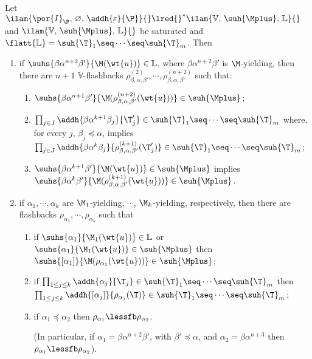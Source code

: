 \begin{lemma}
\label{lem.flashback}
Let $\ilam{\por{I}_{\P},\,\varnothing ,\, \addh{\varepsilon}{\P}
}{} \lred{}^* \ilam{\mathbb{V},\,\suh{\Mplus}, \, \mathbb{L}}{}$ 
and $\ilam{\mathbb{V}, \,\suh{\Mplus} ,\, \mathbb{L}}{}$ 
be saturated and 
$\flatt{\mathbb{L}}=\suh{\T}_1\seq\cdots\seq\suh{\T}_m$. Then
\begin{enumerate}
\item
if $\suhs{\beta\alpha^{n+2}\beta'}{\M(\wt{u})}\in\mathbb{L}$, where 
$\beta\alpha^{n+2}\beta'$ is $\M$-yielding, then there
are $n+1$ $\mathbb{V}$-flashbacks $\rho_{\beta,\alpha,\beta'}^{(2)}, \cdots  
, \rho_{\beta,\alpha,\beta'}^{(n+2)}$ such that:
\begin{enumerate}
\item
$\suhs{\beta \alpha^{n+1}\beta'}{\M(\rho_{\beta,\alpha,\beta'}^{(n+2)}(\wt{u}))} \in 
\suh{\Mplus}$;
\item
$\prod_{j\in J}\addh{\beta \alpha^{k+1}\beta_j}{\T_j'} \in \suh{\T}_1\seq\cdots\seq
\suh{\T}_m$ where, 
for every $j$, $\beta_j \preceq \alpha$, implies 
$\prod_{j\in J}\addh{\beta \alpha^{k}\beta_j}{\rho_{\beta,\alpha,\beta'}^{(k+1)}(\T_j')} 
\in \suh{\T}_1\seq\cdots\seq\suh{\T}_m$;
\item
$\suhs{\beta \alpha^{k+1}\beta'}{\M(\wt{u})} \in \suh{\Mplus}$ 
 implies 
$\suhs{\beta \alpha^{k}\beta'}{\M(\rho_{\beta,\alpha,\beta'}^{(k+1)}(\wt{u}))} \in 
\suh{\Mplus}$.
\end{enumerate}

\item 
if $\alpha_1, \cdots, \alpha_k$ are  $\M_1$-yielding, $\cdots$, $\M_k$-yielding, respectively,
  then there are flashbacks $\rho_{\alpha_1}, \cdots, \rho_{\alpha_k}$ 
such that
\begin{enumerate}
\item
if $\suhs{\alpha_1}{\M_1(\wt{u})} \in \mathbb{L}$ or 
$\suhs{\alpha_1}{\M_1(\wt{u})} \in  \suh{\Mplus}$ 
then $\suhs{[\alpha_1]}{\M(\rho_{\alpha_1}(\wt{u}))} \in \suh{\Mplus}$;
\item
if $\prod_{1 \leq j \leq k}\addh{\alpha_j}{\T_j} \in \suh{\T}_1\seq\cdots\seq\suh{\T}_m$ 
then \\
$\prod_{1 \leq j \leq k}\addh{[\alpha_j]}{\rho_{\alpha_j}(\T)} \in \suh{\T}_1\seq\cdots\seq\suh{\T}_m$;

\item
if $\alpha_1 \preceq \alpha_2$ then $\rho_{\alpha_1} \lessfb \rho_{\alpha_2}$.

(In particular, if $\alpha_1 = \beta \alpha^{n+2}\beta'$, with $\beta' \preceq 
\alpha$, and $\alpha_2 = \beta \alpha^{n+3}$ then
$\rho_{\alpha_1} \lessfb \rho_{\alpha_2}$).
\end{enumerate}
\end{enumerate}
\end{lemma}

